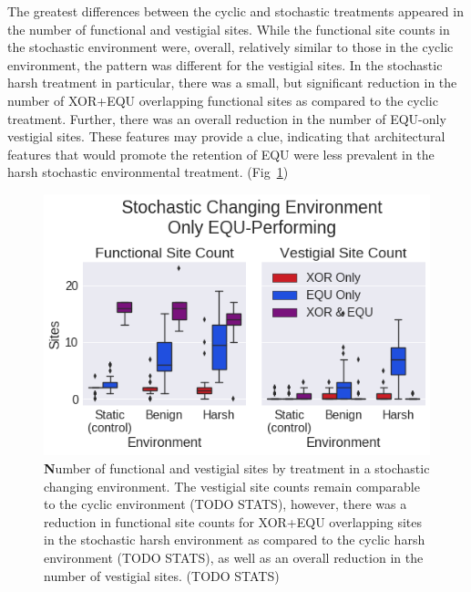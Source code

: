 \documentclass[PhD]{msu-thesis}
\begin{document}
The greatest differences between the cyclic and stochastic treatments appeared in the number of functional and vestigial sites. While the functional site counts in the stochastic environment were, overall, relatively similar to those in the cyclic environment, the pattern was different for the vestigial sites. In the stochastic harsh treatment in particular, there was a small, but significant reduction in the number of XOR+EQU overlapping functional sites as compared to the cyclic treatment. Further, there was an overall reduction in the number of EQU-only vestigial sites. These features may provide a clue, indicating that architectural features that would promote the retention of EQU were less prevalent in the harsh stochastic environmental treatment. (Fig~\ref{fig:CSE_func_vestigial}) 

\begin{figure}[!h]
\includegraphics[trim={0 0 0 0}, clip, width=0.75\columnwidth]{figures/CE/CSE_func_vest__filtered__box.png}
\caption{{\textbf Number of functional and vestigial sites by treatment} in a stochastic changing environment. The vestigial site counts remain comparable to the cyclic environment (TODO STATS), however, there was a reduction in functional site counts for XOR+EQU overlapping sites in the stochastic harsh environment as compared to the cyclic harsh environment (TODO STATS), as well as an overall reduction in the number of vestigial sites. (TODO STATS)%
}
\label{fig:CSE_func_vestigial} %
\end{figure}
\end{document}
